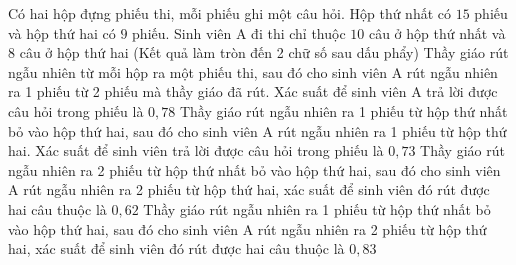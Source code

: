 \begin{ex}%
Có hai hộp đựng phiếu thi, mỗi phiếu ghi một câu hỏi. Hộp thứ nhất có $15$ phiếu và hộp thứ hai có $9$ phiếu. Sinh viên A đi thi chỉ thuộc $10$ câu ở hộp thứ nhất và $8$ câu ở hộp thứ hai (Kết quả làm tròn đến 2 chữ số sau dấu phẩy)
\choiceTF
{\True Thầy giáo rút ngẫu nhiên từ mỗi hộp ra một phiếu thi, sau đó cho sinh viên A rút ngẫu nhiên ra 1 phiếu từ 2 phiếu mà thầy giáo đã rút. Xác suất để sinh viên A trả lời được câu hỏi trong phiếu là $0,78$}
{Thầy giáo rút ngẫu nhiên ra 1 phiếu từ hộp thứ nhất bỏ vào hộp thứ hai, sau đó cho sinh viên A rút ngẫu nhiên ra 1 phiếu từ hộp thứ hai. Xác suất để sinh viên trả lời được câu hỏi trong phiếu là $0,73$}
{Thầy giáo rút ngẫu nhiên ra 2 phiếu từ hộp thứ nhất bỏ vào hộp thứ hai, sau đó cho sinh viên A rút ngẫu nhiên ra 2 phiếu từ hộp thứ hai, xác suất để sinh viên đó rút được hai câu thuộc là $0,62$}
{Thầy giáo rút ngẫu nhiên ra 1 phiếu từ hộp thứ nhất bỏ vào hộp thứ hai, sau đó cho sinh viên A rút ngẫu nhiên ra 2 phiếu từ hộp thứ hai, xác suất để sinh viên đó rút được hai câu thuộc là $0,83$}
\end{ex}
